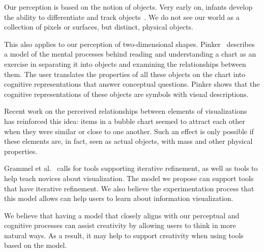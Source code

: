 \label{cognitiveModel}

Our perception is based on the notion of objects.
Very early on, infants develop the ability to differentiate and track objects~\cite{Spelke:CogSci:1990}.
We do not see our world as a collection of pixels or surfaces, but distinct, physical objects.

This also applies to our perception of two-dimensional shapes.
Pinker~\cite{Pinker:AIFT:1990} describes a model of the mental processes behind reading and understanding a chart as an exercise in separating it into objects and examining the relationships between them.
The user translates the properties of all these objects on the chart into cognitive representations that answer conceptual questions.
Pinker shows that the cognitive representations of these objects are symbols with visual descriptions.

Recent work on the perceived relationships between elements of visualizations~\cite{Ziemkiewicz:InfoVis:2010} has reinforced this idea: items in a bubble chart seemed to attract each other when they were similar or close to one another.
Such an effect is only possible if these elements are, in fact, seen as actual objects, with mass and other physical properties.

Grammel et al.~\cite{Grammel2010} calls for tools supporting iterative refinement, as well as tools to help teach novices about visualization.
The model we propose can support tools that have iterative refinement.
We also believe the experimentation process that this model allows can help users to learn about information visualization.

We believe that having a model that closely aligns with our perceptual and cognitive processes can assist creativity by allowing users to think in more natural ways.
As a result, it may help to support creativity when using tools based on the model.